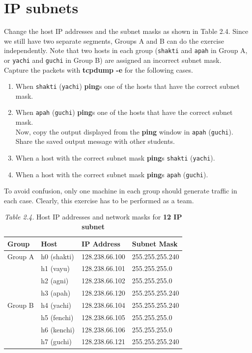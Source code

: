 \documentclass{../UTNetLab}
\begin{document}
\section{IP subnets}
    Change the host IP addresses and the subnet masks as shown in Table 2.4. Since we still have two separate segments, Groups A and B can do the exercise independently.
    Note that two hosts in each group (\texttt{shakti} and \texttt{apah} in Group A, or \texttt{yachi} and \texttt{guchi} in Group B) are assigned an incorrect subnet mask. \\
    Capture the packets with \textbf{tcpdump -e} for the following cases. \\
    \begin{enumerate}
        \item When \texttt{shakti} (\texttt{yachi}) \textbf{ping}s one of the hosts that have the correct subnet mask.
        \item When \texttt{apah} (\texttt{guchi}) \textbf{ping}s one of the hosts that have the correct subnet mask. \\ Now, copy the output displayed from the \textbf{ping} window in \texttt{apah} (\texttt{guchi}).
        Share the saved output message with other students.
        \item When a host with the correct subnet mask \textbf{ping}s \texttt{shakti} (\texttt{yachi}).
        \item When a host with the correct subnet mask \textbf{ping}s \texttt{apah} (\texttt{guchi}).
    \end{enumerate}
    To avoid confusion, only one machine in each group should generate traffic in each case.
    Clearly, this exercise has to be performed as a team.
    \begin{table}[H]
        \caption{\textit{Table 2.4.} Host IP addresses and network masks for \textbf{12 IP subnet}}
        \vspace{5pt}
        \centering
        \begin{tabular}{ l l l l }
            \hline \hline
            Group & Host & IP Address & Subnet Mask \\
            \hline 
            Group A & h0 (shakti) & 128.238.66.100 & 255.255.255.240 \\
                    & h1 (vayu) & 128.238.66.101 & 255.255.255.0 \\
                    & h2 (agni) & 128.238.66.102 & 255.255.255.0 \\
                    & h3 (apah) & 128.238.66.120 & 255.255.255.240 \\
                    \hline
            Group B & h4 (yachi) & 128.238.66.104 & 255.255.255.240 \\
                    & h5 (fenchi) & 128.238.66.105 & 255.255.255.0 \\
                    & h6 (kenchi) & 128.238.66.106 & 255.255.255.0 \\
                    & h7 (guchi) & 128.238.66.121 & 255.255.255.240 \\
            \hline \hline
            \end{tabular}
    \end{table}
\end{document}
